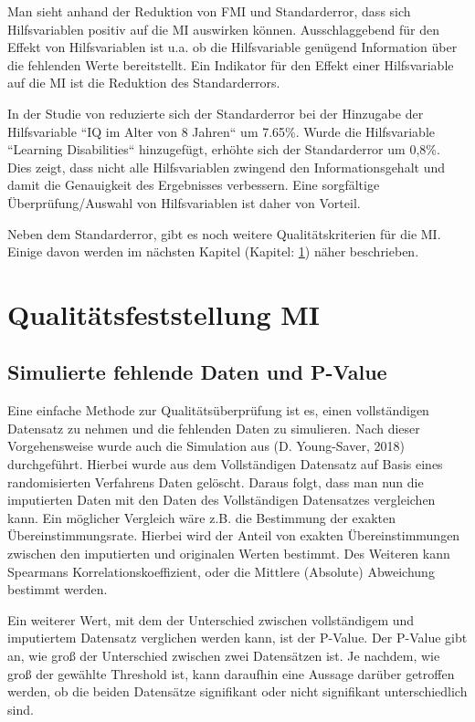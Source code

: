 Man sieht anhand der Reduktion von FMI und Standarderror, dass sich Hilfsvariablen positiv auf die MI auswirken können. Ausschlaggebend für den Effekt von Hilfsvariablen
ist u.a. ob die Hilfsvariable genügend Information über die fehlenden Werte bereitstellt. \autocite[1302]{Hughes2019} Ein Indikator für den Effekt einer Hilfsvariable auf 
die MI ist die Reduktion des Standarderrors. 

In der Studie von \textcite[]{Madley-Dowd2019} 
reduzierte sich der Standarderror bei der Hinzugabe der Hilfsvariable 
``IQ im Alter von 8 Jahren`` um 7.65\%. Wurde die Hilfsvariable ``Learning Disabilities``  hinzugefügt, erhöhte sich der Standarderror um 0,8\%. \autocite[71]{Madley-Dowd2019} 
Dies zeigt, dass nicht alle Hilfsvariablen zwingend den Informationsgehalt und damit die Genauigkeit des Ergebnisses verbessern. 
Eine sorgfältige Überprüfung/Auswahl von Hilfsvariablen ist daher von Vorteil. 

Neben dem Standarderror, gibt es noch weitere Qualitätskriterien für die MI. Einige davon werden im nächsten Kapitel
(Kapitel: \ref{section:qualtity}) näher beschrieben.


\section{Qualitätsfeststellung MI}
\label{section:qualtity}

\subsection{Simulierte fehlende Daten und P-Value}

Eine einfache Methode zur Qualitätsüberprüfung ist es, einen vollständigen Datensatz zu nehmen und die fehlenden Daten zu 
simulieren. Nach dieser Vorgehensweise wurde auch die Simulation aus (D. Young-Saver, 2018) durchgeführt. Hierbei wurde 
aus dem Vollständigen Datensatz auf Basis eines randomisierten Verfahrens Daten gelöscht. Daraus folgt, dass man nun die 
imputierten Daten mit den Daten des Vollständigen Datensatzes vergleichen kann. Ein möglicher Vergleich wäre z.B. die 
Bestimmung der exakten Übereinstimmungsrate. Hierbei wird der Anteil von exakten Übereinstimmungen zwischen den imputierten 
und originalen Werten bestimmt. Des Weiteren kann Spearmans Korrelationskoeffizient, oder die Mittlere (Absolute) Abweichung 
bestimmt werden. \autocite[3664]{Young-Saver2018} 

Ein weiterer Wert, mit dem der Unterschied zwischen vollständigem und imputiertem Datensatz verglichen werden kann, ist der P-Value.
Der P-Value gibt an, wie groß der Unterschied zwischen zwei Datensätzen ist. Je nachdem, wie groß der gewählte Threshold ist,
kann daraufhin eine Aussage darüber getroffen werden, ob die beiden Datensätze signifikant oder nicht signifikant unterschiedlich
sind. 

